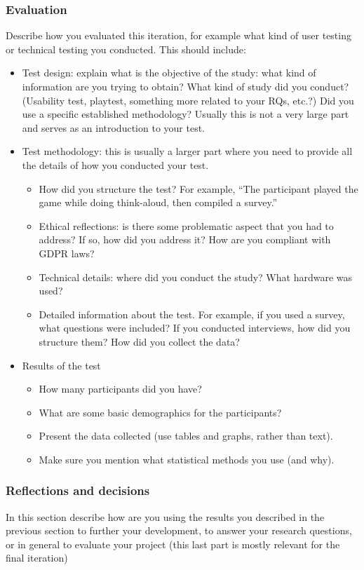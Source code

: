 \documentclass[conference]{IEEEtran}
\begin{document}
\subsubsection{Evaluation}

Describe how you evaluated this iteration, for example what kind of user testing or technical testing you conducted. This should include:

\begin{itemize}
	\item Test design: explain what is the objective of the study: what kind of information are you trying to obtain? What kind of study did you conduct? (Usability test, playtest, something more related to your RQs, etc.?) Did you use a specific established methodology? Usually this is not a very large part and serves as an introduction to your test.
	\item Test methodology: this is usually a larger part where you need to provide all the details of how you conducted your test. 
	\begin{itemize}
		\item How did you structure the test? For example, “The participant played the game while doing think-aloud, then compiled a survey.”
		\item Ethical reflections: is there some problematic aspect that you had to address? If so, how did you address it? How are you compliant with GDPR laws? 
		\item Technical details: where did you conduct the study? What hardware was used? 
		\item Detailed information about the test. For example, if you used a survey, what questions were included? If you conducted interviews, how did you structure them? How did you collect the data?
	\end{itemize}
	\item Results of the test
	\begin{itemize}
		\item How many participants did you have?
		\item What are some basic demographics for the participants?
		\item Present the data collected (use tables and graphs, rather than text). 
		\item Make sure you mention what statistical methods you use (and why).
	\end{itemize}
\end{itemize}


\subsubsection{Reflections and decisions}
In this section describe how are you using the results you described in the previous section to further your development, to answer your research questions, or in general to evaluate your project (this last part is mostly relevant for the final iteration)
\end{document}

